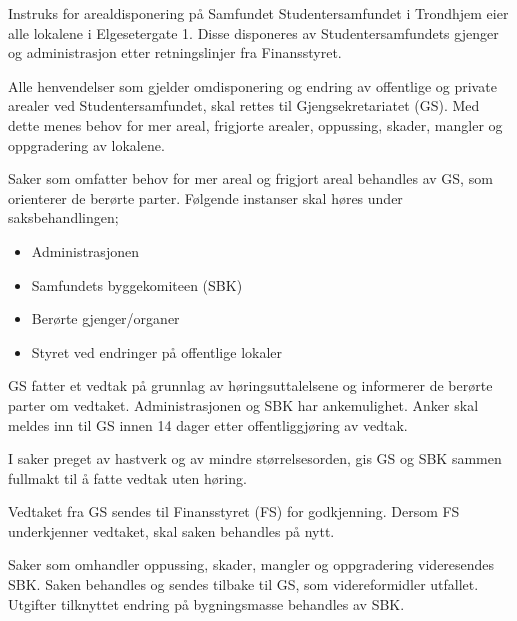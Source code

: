 \begin{instruks}{Instruks for arealdisponering på Samfundet}{}{}
    Studentersamfundet i Trondhjem eier alle lokalene i Elgesetergate 1. Disse disponeres
    av Studentersamfundets
    gjenger og administrasjon etter retningslinjer fra Finansstyret.

    Alle henvendelser som gjelder omdisponering og endring av offentlige og private
    arealer ved Studentersamfundet,
    skal rettes til Gjengsekretariatet (GS). Med dette menes behov for mer areal,
    frigjorte arealer, oppussing, skader,
    mangler og oppgradering av lokalene.

    Saker som omfatter behov for mer areal og frigjort areal behandles av GS, som
    orienterer de berørte parter. Følgende
    instanser skal høres under saksbehandlingen;

    \begin{itemize}
        \item Administrasjonen
        \item Samfundets byggekomiteen (SBK)
        \item Berørte gjenger/organer
        \item Styret ved endringer på offentlige lokaler
    \end{itemize}

    GS fatter et vedtak på grunnlag av høringsuttalelsene og informerer de berørte parter
    om vedtaket. Administrasjonen
    og SBK har ankemulighet. Anker skal meldes inn til GS innen 14 dager etter
    offentliggjøring av vedtak.

    I saker preget av hastverk og av mindre størrelsesorden, gis GS og SBK sammen fullmakt
    til å fatte vedtak uten
    høring.

    Vedtaket fra GS sendes til Finansstyret (FS) for godkjenning. Dersom FS underkjenner
    vedtaket, skal saken behandles
    på nytt.

    Saker som omhandler oppussing, skader, mangler og oppgradering videresendes SBK. Saken
    behandles og sendes
    tilbake til GS, som videreformidler utfallet. Utgifter tilknyttet endring på
    bygningsmasse behandles av SBK.

\end{instruks}

